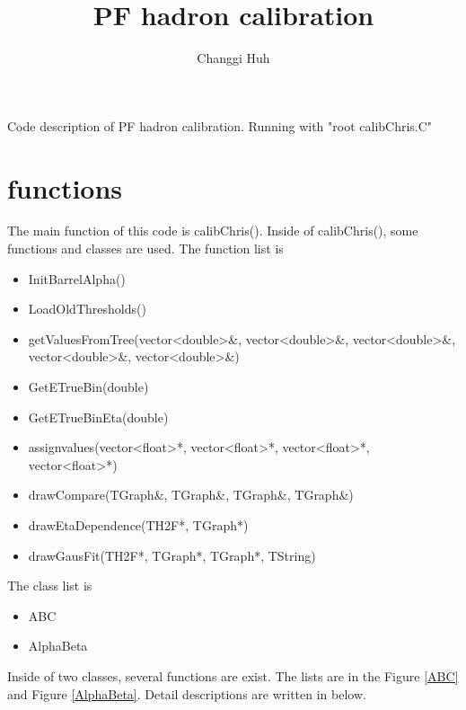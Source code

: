 \documentclass{cernrep}
\begin{document}
\title{PF hadron calibration}
\author{Changgi Huh}

\maketitle

Code description of PF hadron calibration.
Running with "root calibChris.C"

\section{functions}

The main function of this code is calibChris(). Inside of calibChris(), some functions and classes are used. The function list is 
\begin{itemize}
\item InitBarrelAlpha()
\item LoadOldThresholds()
\item getValuesFromTree(vector<double>\&, vector<double>\&, vector<double>\&, vector<double>\&, vector<double>\&)
\item GetETrueBin(double)
\item GetETrueBinEta(double)
\item assignvalues(vector<float>*, vector<float>*, vector<float>*, vector<float>*)
\item drawCompare(TGraph\&, TGraph\&, TGraph\&, TGraph\&)
\item drawEtaDependence(TH2F*, TGraph*)
\item drawGausFit(TH2F*, TGraph*, TGraph*, TString)
\end{itemize}

The class list is

\begin{itemize}
\item ABC
\item AlphaBeta
\end{itemize}

Inside of two classes, several functions are exist. The lists are in the Figure \ref{ABC} and Figure \ref{AlphaBeta}. Detail descriptions are written in below.
\end{document}
